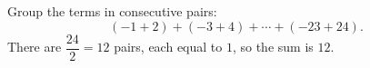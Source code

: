 Group the terms in consecutive pairs:
\[
(-1+2)+(-3+4)+\cdots+(-23+24).
\]
There are $\dfrac{24}{2}=12$ pairs, each equal to $1$, so the sum is $\boxed{12}$.
